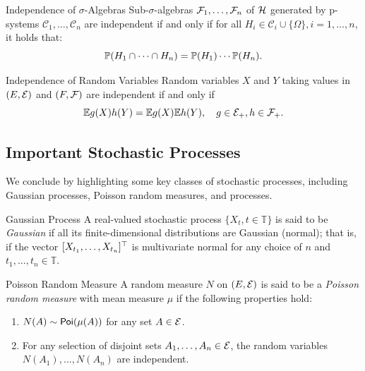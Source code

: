 \begin{thm}{Independence of $\sigma$-Algebras}{}
	Sub-$\sigma$-algebras $\mathcal{F}_1, \dots, \mathcal{F}_n$ of $\mathcal{H}$ generated by p-systems $\mathcal{C}_1, \dots, \mathcal{C}_n$ are independent if and only if for all $H_i \in \mathcal{C}_i \cup \{\Omega\}, i = 1, \dots, n$, it holds that:
	\begin{equation}
		\mathbb{P}(H_1 \cap \dots \cap H_n) = \mathbb{P}(H_1) \cdots \mathbb{P}(H_n).
		\label{eq:ProductMeasureOnPiSystem}
	\end{equation}
\end{thm}

\begin{thm}{Independence of Random Variables}{}
	Random variables $X$ and $Y$ taking values in $(E, \mathcal{E})$ and $(F, \mathcal{F})$ are independent if and only if
	\begin{equation}
		\mathbb{E} g(X) h(Y) = \mathbb{E} g(X) \mathbb{E} h(Y), \quad g \in \mathcal{E}_+, h \in \mathcal{F}_+.
		\label{eq:IndependenceViaExpectation}
	\end{equation}
\end{thm}

\subsection{Important Stochastic Processes}
We conclude by highlighting some key classes of stochastic processes, including Gaussian processes, Poisson random measures, and \Levy{} processes.

\begin{defn}{Gaussian Process}{}
	A real-valued stochastic process $\{X_t, t \in \mathbb{T}\}$ is said to be \textit{Gaussian} if all its finite-dimensional distributions are Gaussian (normal); that is, if the vector $[X_{t_1}, \dots, X_{t_n}]^{\top}$ is multivariate normal for any choice of $n$ and $t_1, \dots, t_n \in \mathbb{T}$.
\end{defn}

\begin{defn}{Poisson Random Measure}{}
	A random measure $N$ on $(E, \mathcal{E})$ is said to be a \textit{Poisson random measure} with mean measure $\mu$ if the following properties hold:
	\begin{enumerate}
		\item $N(A) \sim \mathsf{Poi}(\mu(A))$ for any set $A \in \mathcal{E}$.
		\item For any selection of disjoint sets $A_1, \dots, A_n \in \mathcal{E}$, the random variables $N(A_1), \dots, N(A_n)$ are independent.
	\end{enumerate}
\end{defn}


